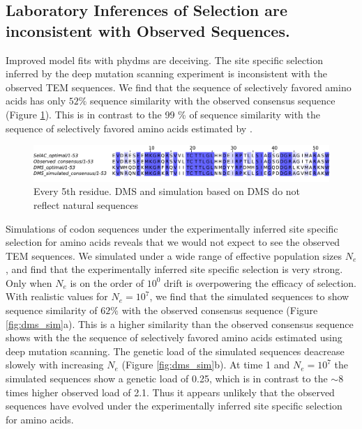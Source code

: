 \documentclass[12pt]{article}
\begin{document}
\subsection*{Laboratory Inferences of Selection are inconsistent with Observed Sequences.}
Improved model fits with phydms are deceiving.
The site specific selection inferred by the deep mutation scanning experiment is inconsistent with the observed TEM sequences.
We find that the sequence of selectively favored amino acids has only $52 \%$ sequence similarity with the observed consensus sequence (Figure \ref{fig:sim_seqs_cons}).
This is in contrast to the 99 \% of sequence similarity with the sequence of selectively favored amino acids estimated by \selac.

\begin{figure}[H]
     \centering
	\includegraphics[width=\textwidth]{img/seq_simil_short.pdf}
	\caption{Every 5th residue. DMS and simulation based on DMS do not reflect natural sequences}
	\label{fig:sim_seqs_cons}
\end{figure}

Simulations of codon sequences under the experimentally inferred site specific selection for amino acids reveals that we would not expect to see the observed TEM sequences.
We simulated under a wide range of effective population sizes $N_e$, and find that the experimentally inferred site specific selection is very strong.
Only when $N_e$ is on the order of $10^0$ drift is overpowering the efficacy of selection.
With realistic values for $N_e = 10^7$, we find that the simulated sequences to show sequence similarity of $62 \%$ with the observed consensus sequence (Figure \ref{fig:dms_sim}a).
This is a higher similarity than the observed consensus sequence shows with the the sequence of selectively favored amino acids estimated using deep mutation scanning.
The genetic load of the simulated sequences deacrease slowely with increasing $N_e$ (Figure \ref{fig:dms_sim}b).
At time 1 and $N_e = 10^7$ the simulated sequences show a genetic load of 0.25, which is in contrast to the $\sim 8$ times higher observed load of 2.1.
Thus it appears unlikely that the observed sequences have evolved under the experimentally inferred site specific selection for amino acids.
\end{document}
